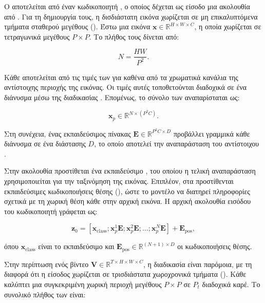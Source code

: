 Ο  αποτελείται από έναν κωδικοποιητή , ο οποίος
δέχεται ως είσοδο μια ακολουθία από . Για τη δημιουργία τους, η
δισδιάστατη εικόνα χωρίζεται σε μη επικαλυπτόμενα τμήματα σταθερού μεγέθους
(). Έστω μια εικόνα
\(\mathbf{x}\in\mathbb{R}^{H\times W\times C}\), η οποία χωρίζεται σε
τετραγωνικά  μεγέθους \(P\times P\). Το πλήθος τους δίνεται από:

\begin{equation}
    N=\frac{HW}{P^2}.
    \label{eq:number-image-patches}
\end{equation}

Κάθε  αποτελείται από τις τιμές των  για καθένα από τα
χρωματικά κανάλια της αντίστοιχης περιοχής της εικόνας. Οι τιμές αυτές τοποθετούνται διαδοχικά σε ένα διάνυσμα μέσω της
διαδικασίας . Επομένως, το σύνολο των 
αναπαρίσταται ως:

\begin{equation}
    \mathbf{x}_p\in\mathbb{R}^{N\times(P^2C)}.
    \label{eq:flattened-image-patches}
\end{equation}

Στη συνέχεια, ένας εκπαιδεύσιμος πίνακας
\(\mathbf{E}\in\mathbb{R}^{P^2C\times D}\) προβάλλει γραμμικά κάθε
διάνυσμα σε ένα  διάστασης \(D\), το οποίο αποτελεί την
αναπαράσταση του αντίστοιχου .

Στην ακολουθία προστίθεται ένα εκπαιδεύσιμο , του οποίου η
τελική αναπαράσταση χρησιμοποιείται για την ταξινόμηση της εικόνας. Επιπλέον,
στα  προστίθενται εκπαιδεύσιμες κωδικοποιήσεις θέσης
(), ώστε το μοντέλο να διατηρεί
πληροφορίες σχετικά με τη χωρική θέση κάθε  στην αρχική εικόνα. Η
αρχική ακολουθία εισόδου του κωδικοποιητή γράφεται ως:

\begin{equation}
    \mathbf{z}_0=
    \left[
        \mathbf{x}_{\mathrm{class}};
        \mathbf{x}_p^1\mathbf{E};
        \mathbf{x}_p^2\mathbf{E};
        \ldots;
        \mathbf{x}_p^N\mathbf{E}
    \right]
    +\mathbf{E}_{\mathrm{pos}},
    \label{eq:vit-input-sequence}
\end{equation}

όπου \(\mathbf{x}_{\mathrm{class}}\) είναι το εκπαιδεύσιμο 
και \(\mathbf{E}_{\mathrm{pos}}\in\mathbb{R}^{(N+1)\times D}\) οι
κωδικοποιήσεις θέσης.

Στην περίπτωση ενός βίντεο
\(\mathbf{V}\in\mathbb{R}^{T\times H\times W\times C}\), η διαδικασία
είναι παρόμοια, με τη διαφορά ότι η είσοδος χωρίζεται σε τρισδιάστατα
χωροχρονικά τμήματα
(). Κάθε  καλύπτει μια συγκεκριμένη χωρική περιοχή
μεγέθους \(P\times P\) σε \(P_t\) διαδοχικά καρέ. Το συνολικό πλήθος των
 είναι:

